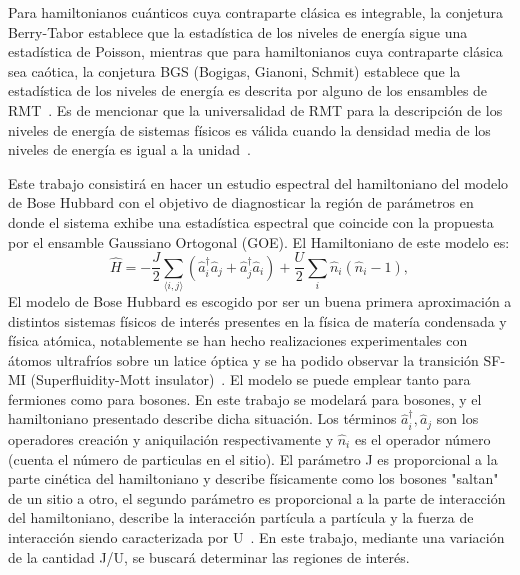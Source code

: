 \documentclass[spanish,titlepage,table]{practicas}
\begin{document}
Para hamiltonianos cuánticos cuya contraparte clásica es integrable, la conjetura Berry-Tabor establece que 
la estadística de los niveles de energía sigue una estadística de Poisson, mientras que para hamiltonianos 
cuya contraparte clásica sea caótica, la conjetura BGS (Bogigas, Gianoni, Schmit) establece que la estadística de los niveles de energía es descrita 
por alguno de los ensambles de RMT~\cite{Atas_2013}.
Es de mencionar que la universalidad de RMT para la descripción de los niveles de energía de sistemas físicos 
es válida cuando la densidad media de los niveles de energía es igual a la unidad~\cite{Atas_2013}.


Este trabajo consistirá en hacer un estudio espectral del hamiltoniano del modelo de Bose Hubbard 
con el objetivo de diagnosticar la región de parámetros en donde el sistema exhibe una estadística espectral 
que coincide con la propuesta por el ensamble Gaussiano Ortogonal (GOE). El Hamiltoniano de este modelo es:
\begin{equation}
\hat{H}
= -\frac{J}{2} \sum_{\langle i,j\rangle} \!\left(\hat{a}_i^{\dagger}\hat{a}_j + \hat{a}_j^{\dagger}\hat{a}_i\right)
+ \frac{U}{2}\sum_{i}\hat{n}_i(\hat{n}_i - 1),
\end{equation}
El modelo de Bose Hubbard es escogido por ser un buena primera aproximación a distintos sistemas físicos de interés presentes en la física de matería condensada y física atómica, notablemente 
se han hecho realizaciones experimentales con átomos ultrafríos sobre un latice óptica y se ha podido observar la transición SF-MI (Superfluidity-Mott insulator)~\cite{Zhang2010}. 
El modelo se puede emplear tanto para fermiones como para bosones. En este trabajo se modelará para bosones, y el hamiltoniano presentado describe dicha situación.
Los términos $\hat{a}_i^{\dagger},\hat{a}_j$ son los operadores creación y aniquilación respectivamente y $\hat{n}_i$ es el operador número (cuenta el número de particulas en el sitio).
El parámetro J es proporcional a la parte cinética del hamiltoniano y describe físicamente como los bosones "saltan" de un sitio a otro, el segundo parámetro es proporcional a la parte de interacción del hamiltoniano, describe 
la interacción partícula a partícula y la fuerza de interacción siendo caracterizada por U~\cite{Zhang2010}. 
En este trabajo, mediante una variación de la cantidad J/U, se buscará determinar las regiones de interés.
\end{document}
